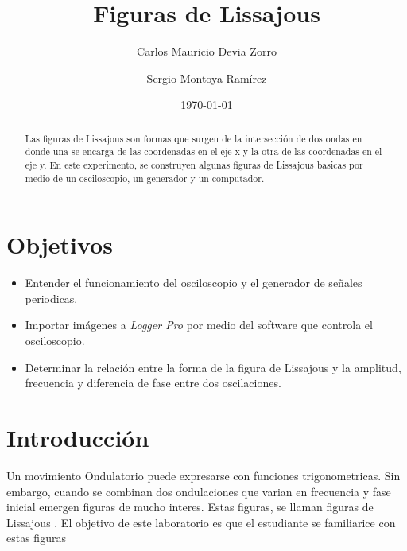 \documentclass[a4paper, amsfonts, amssymb, amsmath, reprint, showkeys, nofootinbib, twoside]{revtex4-1}
\begin{document}
\title{Figuras de Lissajous}


\author{Carlos Mauricio Devia Zorro}

  
\author{Sergio Montoya Ramírez}


\date{\today} %

\begin{abstract}

    Las figuras de Lissajous son formas que surgen de la intersección de dos ondas en donde una se encarga de las coordenadas en el eje x y la otra de las coordenadas en el eje y. En este experimento, se construyen algunas figuras de Lissajous basicas por medio de un osciloscopio, un generador y un computador.

\end{abstract}

\maketitle

\section{Objetivos}
\begin{itemize}
  \item Entender el funcionamiento del osciloscopio y el generador de señales periodicas.
  \item Importar imágenes a \textit{Logger Pro} por medio del software que controla el osciloscopio.
  \item Determinar la relación entre la forma de la figura de Lissajous y la amplitud, frecuencia y diferencia de fase entre dos oscilaciones.
\end{itemize}
\section{Introducción}

Un movimiento Ondulatorio puede expresarse con funciones trigonometricas. Sin embargo, cuando se combinan dos ondulaciones que varian en frecuencia y fase inicial emergen figuras de mucho interes. Estas figuras, se llaman figuras de Lissajous \cite{French}. El objetivo de este laboratorio es que el estudiante se familiarice con estas figuras
\end{document}
